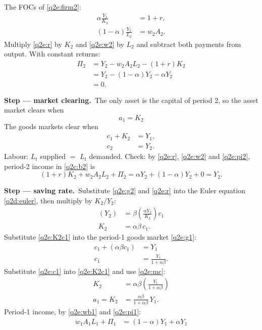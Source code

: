 \documentclass[11pt,a4paper]{article}
\newcommand{\passo}[2]{\par\smallskip\noindent\textbf{Step --- #1.}~#2}
\begin{document}
\begin{sol}
\begin{equation}
\end{equation}
The FOCs of \eqref{q2e:firm2}:
\begin{align}
\alpha\frac{Y_2}{K_2} &= 1+r, \label{q2e:r}\\
(1-\alpha)\frac{Y_2}{L_2} &= w_2A_2. \label{q2e:w2}
\end{align}
Multiply \eqref{q2e:r} by $K_2$ and \eqref{q2e:w2} by $L_2$ and subtract both payments from output.
With constant returns:
\begin{align}
\Pi_2 &= Y_2-w_2A_2L_2-(1+r)K_2\nonumber\\
&= Y_2-(1-\alpha)Y_2-\alpha Y_2\nonumber\\
&= \boxed{0}. \label{q2e:pi2}
\end{align}
\passo{market clearing}{The only asset is the capital of period 2, so the asset market clears when}
\begin{equation}
\boxed{a_1=K_2} \label{q2e:mc}
\end{equation}
The goods markets clear when
\begin{align}
c_1+K_2 &= Y_1, \label{q2e:g1}\\
c_2 &= Y_2. \label{q2e:g2}
\end{align}
Labour: $L_t$ supplied $=$ $L_t$ demanded. Check: by \eqref{q2e:r}, \eqref{q2e:w2} and
\eqref{q2e:pi2}, period-2 income in \eqref{q2c:b2} is
\[
(1+r)K_2+w_2A_2L_2+\Pi_2=\alpha Y_2+(1-\alpha)Y_2+0=Y_2 .
\]
\passo{saving rate}{Substitute \eqref{q2e:g2} and \eqref{q2e:r} into the Euler equation
\eqref{q2d:euler}, then multiply by $K_2/Y_2$:}
\begin{align}
(Y_2) &= \beta\left(\frac{\alpha Y_2}{K_2}\right)c_1\nonumber\\
K_2 &= \alpha\beta\,c_1. \label{q2e:K2c1}
\end{align}
Substitute \eqref{q2e:K2c1} into the period-1 goods market \eqref{q2e:g1}:
\begin{align}
c_1+(\alpha\beta c_1) &= Y_1\nonumber\\
c_1 &= \frac{Y_1}{1+\alpha\beta}. \label{q2e:c1}
\end{align}
Substitute \eqref{q2e:c1} into \eqref{q2e:K2c1} and use \eqref{q2e:mc}:
\begin{align}
K_2 &= \alpha\beta\left(\frac{Y_1}{1+\alpha\beta}\right)\nonumber\\
a_1=K_2 &= \frac{\alpha\beta}{1+\alpha\beta}\,Y_1. \label{q2e:a1}
\end{align}
Period-1 income, by \eqref{q2e:wb1} and \eqref{q2e:pi1}:
\begin{align}
w_1A_1L_1+\Pi_1 &= (1-\alpha)Y_1+\alpha Y_1\nonumber\\

\end{align}
\end{sol}
\end{document}
